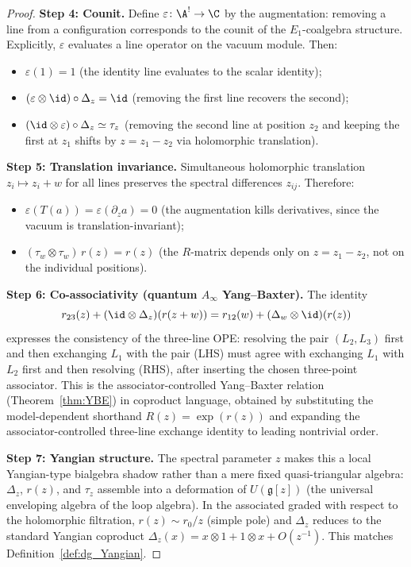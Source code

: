 \begin{proof}
\medskip
\noindent\textbf{Step 4: Counit.}
Define $\varepsilon \colon \A^! \to \C$ by the augmentation: removing a line from a configuration corresponds to the counit of the $E_1$-coalgebra structure. Explicitly, $\varepsilon$ evaluates a line operator on the vacuum module. Then:
\begin{itemize}
\item $\varepsilon(1) = 1$ (the identity line evaluates to the scalar identity);
\item $(\varepsilon \otimes \id) \circ \Delta_z = \id$ (removing the first line recovers the second);
\item $(\id \otimes \varepsilon) \circ \Delta_z \simeq \tau_z$ (removing the second line at position $z_2$ and keeping the first at $z_1$ shifts by $z = z_1 - z_2$ via holomorphic translation).
\end{itemize}

\medskip
\noindent\textbf{Step 5: Translation invariance.}
Simultaneous holomorphic translation $z_i \mapsto z_i + w$ for all lines preserves the spectral differences $z_{ij}$. Therefore:
\begin{itemize}
\item $\varepsilon(T(a)) = \varepsilon(\partial_z a) = 0$ (the augmentation kills derivatives, since the vacuum is translation-invariant);
\item $(\tau_w \otimes \tau_w)\, r(z) = r(z)$ (the $R$-matrix depends only on $z = z_1 - z_2$, not on the individual positions).
\end{itemize}

\medskip
\noindent\textbf{Step 6: Co-associativity (quantum $A_\infty$ Yang--Baxter).}
The identity
\[
r_{23}(z) + (\id \otimes \Delta_z)(r(z+w)) = r_{12}(w) + (\Delta_w \otimes \id)(r(z))
\]
expresses the consistency of the three-line OPE: resolving the pair
$(L_2,L_3)$ first and then exchanging $L_1$ with the pair (LHS) must
agree with exchanging $L_1$ with $L_2$ first and then resolving (RHS),
after inserting the chosen three-point associator. This is the
associator-controlled Yang--Baxter relation (Theorem~\ref{thm:YBE}) in
coproduct language, obtained by substituting the model-dependent
shorthand \(R(z)=\exp(r(z))\) and expanding the associator-controlled
three-line exchange identity to leading nontrivial order.

\medskip
\noindent\textbf{Step 7: Yangian structure.}
The spectral parameter $z$ makes this a local Yangian-type bialgebra
shadow rather than a mere fixed quasi-triangular algebra: $\Delta_z$,
$r(z)$, and $\tau_z$ assemble into a deformation of
$U(\mathfrak{g}[z])$ (the universal enveloping algebra of the loop
algebra). In the associated graded with respect to the holomorphic
filtration, $r(z) \sim r_0/z$ (simple pole) and $\Delta_z$ reduces to
the standard Yangian coproduct $\Delta_z(x) = x \otimes 1 + 1 \otimes x
+ O(z^{-1})$. This matches Definition~\ref{def:dg_Yangian}.
\end{proof}

